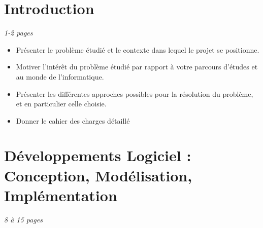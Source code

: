 \documentclass[a4paper]{article} %
\begin{document}



\newpage

\tableofcontents  %

\newpage
\section*{Introduction} %
\emph{1-2 pages}
\begin{itemize}%
\item Présenter le problème étudié et le contexte dans lequel le projet se positionne.
\item Motiver l'intérêt du problème étudié par rapport à votre parcours d'études et au monde de l'informatique.
\item	Présenter les différentes approches possibles pour la résolution du problème, et en particulier celle choisie.
\item Donner le cahier des charges détaillé
\end{itemize}




\section{Développements Logiciel : Conception, Modélisation, Implémentation} 
\emph{8 à 15 pages}
\end{document}
